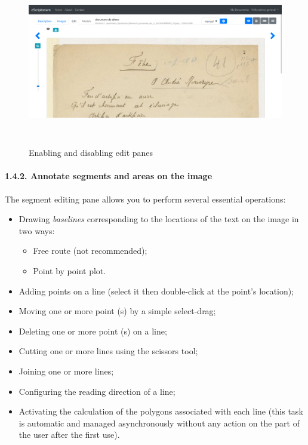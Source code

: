 \documentclass[
]{book}
\begin{document}
\begin{figure}
\centering
\includegraphics[width=6.5in,height=2.90278in]{img/eScrTut/image11.gif}
\caption{Enabling and disabling edit panes}
\end{figure}

\hypertarget{annotate-segments-and-areas-on-the-image}{%
\paragraph{1.4.2. Annotate segments and areas on the image}\label{annotate-segments-and-areas-on-the-image}}

The segment editing pane allows you to perform several essential
operations:

\begin{itemize}
\item
  Drawing \emph{baselines} corresponding to the locations of the text on
  the image in two ways:

  \begin{itemize}
  \item
    Free route (not recommended);
  \item
    Point by point plot.
  \end{itemize}
\item
  Adding points on a line (select it then double-click at the point's
  location);
\item
  Moving one or more point (s) by a simple select-drag;
\item
  Deleting one or more point (s) on a line;
\item
  Cutting one or more lines using the scissors tool;
\item
  Joining one or more lines;
\item
  Configuring the reading direction of a line;
\item
  Activating the calculation of the polygons associated with each line
  (this task is automatic and managed asynchronously without any
  action on the part of the user after the first use).
\end{itemize}
\end{document}
